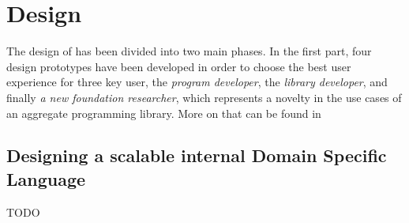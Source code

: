 \chapter{Design}
\label{chap:design}
The design of \this has been divided into two main phases.
%
In the first part, four design prototypes have been developed in order to choose the best user experience for three key user, the \textit{program developer}, the \textit{library developer}, and finally \textit{a new foundation researcher}, which represents a novelty in the use cases of an aggregate programming library.
%
More on that can be found in 

\section{Designing a scalable internal Domain Specific Language} \label{chap:design->sec:dsl}

TODO
